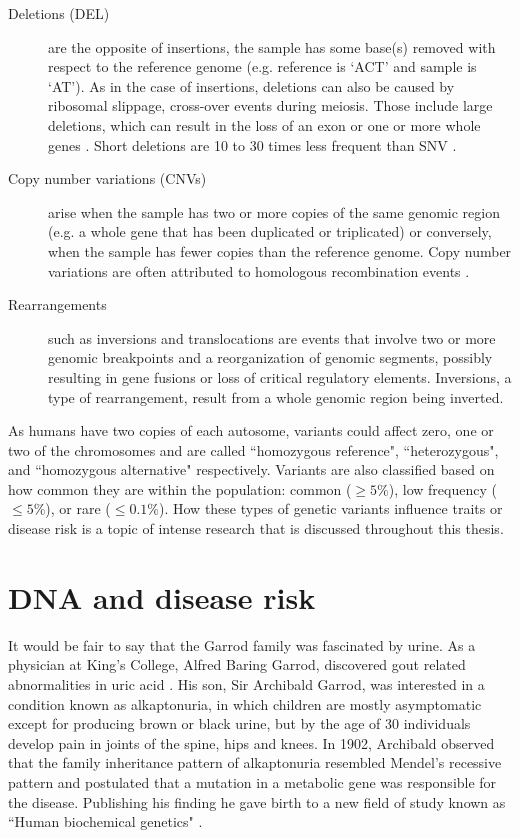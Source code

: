 \begin{description}
	\item[Deletions (DEL)] are the opposite of insertions, the sample has some base(s) removed with respect to the reference genome (e.g. reference is ‘ACT’ and sample is ‘AT’). As in the case of insertions, deletions can also be caused by ribosomal slippage, cross-over events during meiosis. Those include large deletions, which can result in the loss of an exon or one or more whole genes \cite{alberts1995molecular}. Short deletions are 10 to 30 times less frequent than SNV \cite{10002012integrated}.

	\item[Copy number variations (CNVs)] arise when the sample has two or more copies of the same genomic region (e.g. a whole gene that has been duplicated or triplicated) or conversely, when the sample has fewer copies than the reference genome. Copy number variations are often attributed to homologous recombination events \cite{alberts1995molecular}.

	\item[Rearrangements] such as inversions and translocations are events that involve two or more genomic breakpoints and a reorganization of genomic segments, possibly resulting in gene fusions or loss of critical regulatory elements. Inversions, a type of rearrangement, result from a whole genomic region being inverted.

\end{description}

\noindent As humans have two copies of each autosome, variants could affect zero, one or two of the chromosomes and are called ``homozygous reference", ``heterozygous", and ``homozygous alternative" respectively. Variants are also classified based on how common they are within the population: common ($\ge 5\%$), low frequency ($\le 5\%$), or rare ($\le 0.1\%$). How these types of genetic variants influence traits or disease risk is a topic of intense research that is discussed throughout this thesis.

\section{DNA and disease risk}

It would be fair to say that the Garrod family was fascinated by urine. As a physician at King’s College, Alfred Baring Garrod, discovered gout related abnormalities in uric acid \cite{kennedy2001}. His son, Sir Archibald Garrod, was interested in a condition known as alkaptonuria, in which children are mostly asymptomatic except for producing brown or black urine, but by the age of 30 individuals develop pain in joints of the spine, hips and knees. In 1902, Archibald observed that the family inheritance pattern of alkaptonuria resembled Mendel’s recessive pattern and postulated that a mutation in a metabolic gene was responsible for the disease. Publishing his finding he gave birth to a new field of study known as ``Human biochemical genetics" \cite{kennedy2001}.

